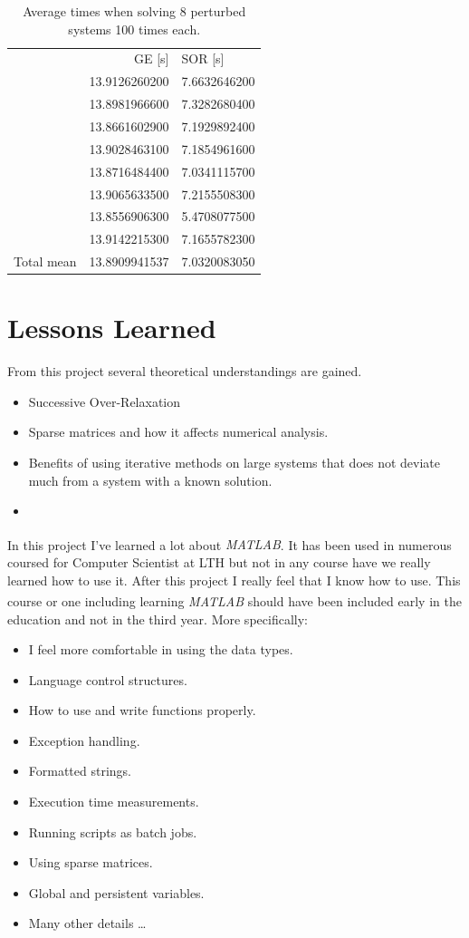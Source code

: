 \documentclass[10pt, a4paper]{article}
\newcommand{\matlab}{\small{\emph{MATLAB\textsuperscript{\textregistered}}}}
\begin{document}
\begin{table}[h]
\begin{center}
\begin{tabular}{l l | l}
\multicolumn{2}{r}{GE [s]} & SOR [s]  \\ \cline{2-3} %
		& 13.9126260200 & 7.6632646200 \\
		& 13.8981966600 & 7.3282680400 \\
		& 13.8661602900 & 7.1929892400 \\
		& 13.9028463100 & 7.1854961600 \\
		& 13.8716484400 & 7.0341115700 \\
		& 13.9065633500 & 7.2155508300 \\
		& 13.8556906300 & 5.4708077500 \\
		& 13.9142215300 & 7.1655782300 \\ \cline{2-3}
Total mean	& 13.8909941537 & 7.0320083050 
\end{tabular}
\caption{Average times when solving 8 perturbed systems 100 times each.}
\end{center}
\label{table+avgpert}
\end{table}

\section{Lessons Learned}
From this project several theoretical understandings are gained.
\begin{itemize}
	\item Successive Over-Relaxation
	\item Sparse matrices  and how it affects numerical analysis.
	\item Benefits of using iterative methods on large systems that does not deviate much from a system with a known solution.
	\item 
\end{itemize}

In this project I've learned a lot about \matlab{}. It has been used in numerous coursed for Computer Scientist at LTH but not in any course have we really learned how to use it. After this project I really feel that I know how to use. This course or one including learning \matlab{} should have been included early in the education and not in the third year. More specifically:

\begin{itemize}
	\item I feel more comfortable in using the data types.
	\item Language control structures.
	\item How to use and write functions properly.
	\item Exception handling.
	\item Formatted strings.
	\item Execution time measurements.
	\item Running scripts as batch jobs.
	\item Using sparse matrices.
	\item Global and persistent variables.
	\item Many other details \ldots
\end{itemize}
\end{document}
